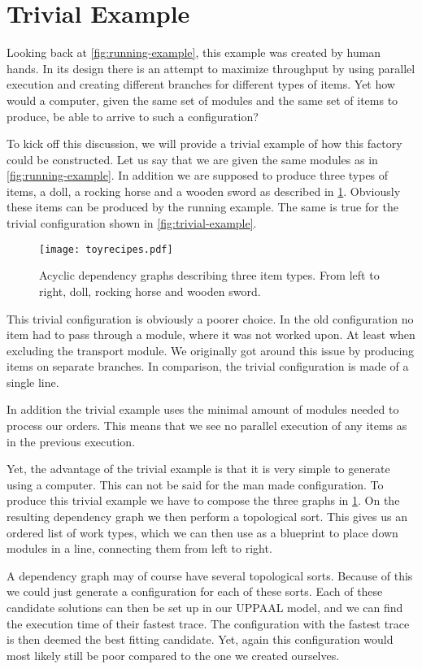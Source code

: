 \section{Trivial Example}
Looking back at \cref{fig:running-example}, this example was created by human hands. In its design there is an attempt to maximize throughput by using parallel execution and creating different branches for different types of items. Yet how would a computer, given the same set of modules and the same set of items to produce, be able to arrive to such a configuration?

To kick off this discussion, we will provide a trivial example of how this factory could be constructed. Let us say that we are given the same modules as in \cref{fig:running-example}. In addition we are supposed to produce three types of items, a doll, a rocking horse and a wooden sword as described in \cref{fig:toy-recipes}. Obviously these items can be produced by the running example. The same is true for the trivial configuration shown in \cref{fig:trivial-example}.  

\begin{figure}[h]
\centering
\texttt{[image: toyrecipes.pdf]}
\caption{Acyclic dependency graphs describing three item types. From left to right, doll, rocking horse and wooden sword.}
\label{fig:toy-recipes}
\end{figure}

This trivial configuration is obviously a poorer choice. In the old configuration no item had to pass through a module, where it was not worked upon. At least when excluding the transport module. We originally got around this issue by producing items on separate branches. In comparison, the trivial configuration is made of a single line.

In addition the trivial example uses the minimal amount of modules needed to process our orders. This means that we see no parallel execution of any items as in the previous execution. 

Yet, the advantage of the trivial example is that it is very simple to generate using a computer. This can not be said for the man made configuration. To produce this trivial example we have to compose the three graphs in \cref{fig:toy-recipes}. On the resulting dependency graph we then perform a topological sort. This gives us an ordered list of work types, which we can then use as a blueprint to place down modules in a line, connecting them from left to right.

A dependency graph may of course have several topological sorts. Because of this we could just generate a configuration for each of these sorts. Each of these candidate solutions can then be set up in our UPPAAL model, and we can find the execution time of their fastest trace. The configuration with the fastest trace is then deemed the best fitting candidate.  Yet, again this configuration would most likely still be poor compared to the one we created ourselves.

